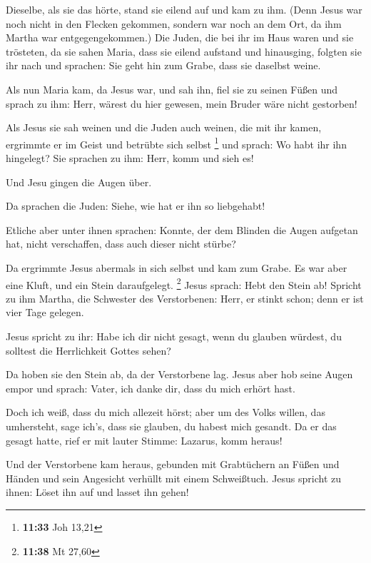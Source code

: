  Dieselbe, als sie das hörte, stand sie eilend auf und kam
zu ihm.  (Denn Jesus war noch nicht in den Flecken
gekommen, sondern war noch an dem Ort, da ihm Martha war
entgegengekommen.)  Die Juden, die bei ihr im Haus waren
und sie trösteten, da sie sahen Maria, dass sie eilend aufstand und
hinausging, folgten sie ihr nach und sprachen: Sie geht hin zum Grabe,
dass sie daselbst weine.

 Als nun Maria kam, da Jesus war, und sah ihn, fiel sie zu
seinen Füßen und sprach zu ihm: Herr, wärest du hier gewesen, mein
Bruder wäre nicht gestorben!

 Als Jesus sie sah weinen und die Juden auch weinen, die
mit ihr kamen, ergrimmte er im Geist und betrübte sich selbst
\footnote{\textbf{11:33} Joh 13,21}  und sprach: Wo habt
ihr ihn hingelegt? Sie sprachen zu ihm: Herr, komm und sieh es!

 Und Jesu gingen die Augen über.

 Da sprachen die Juden: Siehe, wie hat er ihn so
liebgehabt!

 Etliche aber unter ihnen sprachen: Konnte, der dem Blinden
die Augen aufgetan hat, nicht verschaffen, dass auch dieser nicht
stürbe?

 Da ergrimmte Jesus abermals in sich selbst und kam zum
Grabe. Es war aber eine Kluft, und ein Stein daraufgelegt. \footnote{\textbf{11:38}
  Mt 27,60}  Jesus sprach: Hebt den Stein ab! Spricht zu
ihm Martha, die Schwester des Verstorbenen: Herr, er stinkt schon; denn
er ist vier Tage gelegen.

 Jesus spricht zu ihr: Habe ich dir nicht gesagt, wenn du
glauben würdest, du solltest die Herrlichkeit Gottes sehen?

 Da hoben sie den Stein ab, da der Verstorbene lag. Jesus
aber hob seine Augen empor und sprach: Vater, ich danke dir, dass du
mich erhört hast.

 Doch ich weiß, dass du mich allezeit hörst; aber um des
Volks willen, das umhersteht, sage ich's, dass sie glauben, du habest
mich gesandt.  Da er das gesagt hatte, rief er mit lauter
Stimme: Lazarus, komm heraus!

 Und der Verstorbene kam heraus, gebunden mit Grabtüchern
an Füßen und Händen und sein Angesicht verhüllt mit einem Schweißtuch.
Jesus spricht zu ihnen: Löset ihn auf und lasset ihn gehen!

